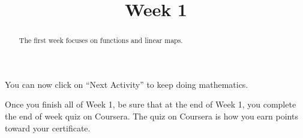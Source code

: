 \documentclass{ximera}
\title{Week 1}
\begin{document}
\begin{abstract}
  The first week focuses on functions and linear maps.
\end{abstract}


You can now click on ``Next Activity'' to keep doing mathematics.

Once you finish all of Week 1, be sure that at the end of Week 1, you
complete the end of week quiz on Coursera.  The quiz on Coursera is
how you earn points toward your certificate.
\end{document}
